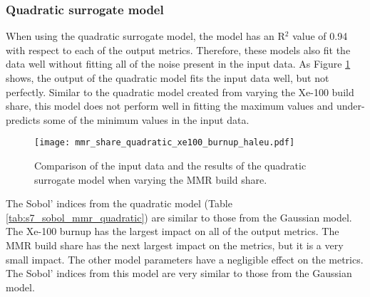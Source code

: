 \subsubsection{Quadratic surrogate model}
When using the quadratic surrogate model, the model has an R$^2$ value of 0.94
with respect to each of the output metrics. Therefore, these models also fit 
the data well without fitting all of the noise present in the input data. 
As Figure \ref{fig:s7_mmr_quadratic} shows, the output of the quadratic model 
fits the input data well, but not perfectly. Similar to the quadratic 
model created from varying the Xe-100 build share, this model 
does not perform well in fitting the maximum values and under-predicts 
some of the minimum values in the input data. 

\begin{figure}
    \centering 
    \texttt{[image: mmr\_share\_quadratic\_xe100\_burnup\_haleu.pdf]}
    \caption{Comparison of the input data and the results of the quadratic 
    surrogate model when varying the MMR build share.}
    \label{fig:s7_mmr_quadratic}
\end{figure}

The Sobol' indices from the quadratic model (Table 
\ref{tab:s7_sobol_mmr_quadratic}) are similar to those from the 
Gaussian model. The Xe-100 burnup has the largest impact on all of the 
output metrics. The \gls{MMR} build share has the next largest impact 
on the metrics, but it is a very small impact. The other model 
parameters have a negligible effect on the metrics. The Sobol' 
indices from this model are very similar to those from the Gaussian 
model. 

